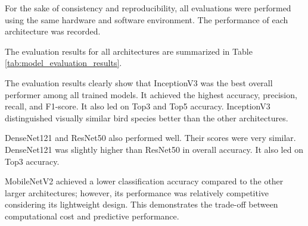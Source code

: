 For the sake of consistency and reproducibility, all evaluations were performed using the
same hardware and software environment. The performance of each architecture was recorded.

The evaluation results for all architectures are summarized in Table
\ref{tab:model_evaluation_results}.

\begin{table}[H]
\centering
\caption{Performance comparison of evaluated deep learning architectures}
\label{tab:model_evaluation_results}
\end{table}

The evaluation results clearly show that InceptionV3 was the best overall performer
among all trained models. It achieved the highest accuracy, 
precision, recall, and F1-score.
It also led on Top\text{-}3 and Top\text{-}5 accuracy.
InceptionV3 distinguished visually similar bird species better than the other architectures.

DenseNet121 and ResNet50 also performed well.
Their scores were very similar.
DenseNet121 was slightly higher than ResNet50 in overall accuracy.
It also led on Top\text{-}3 accuracy.

MobileNetV2 achieved a lower classification accuracy compared to the other larger
architectures; however, its performance was relatively competitive considering its
lightweight design. This demonstrates the trade-off between computational cost and predictive performance.

